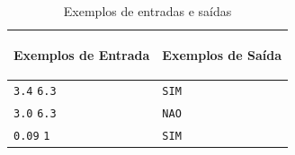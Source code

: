 \begin{table}[ht]
    \centering
    \begin{tabular}{|p{12cm}|p{3cm}|}
        \hline
        \begin{center}
            \vspace{-0.3cm}
            \textbf{Exemplos de Entrada}
            \vspace{-0.3cm}
        \end{center} 
         &  
        \begin{center}
            \vspace{-0.3cm}
            \textbf{Exemplos de Saída}
            \vspace{-0.3cm}
        \end{center} \\ \hline
		    \texttt{3.4} \texttt{6.3}  & \texttt{SIM} \\
         \hline
   		    \texttt{3.0} \texttt{6.3}  & \texttt{NAO} \\
         \hline    
   		    \texttt{0.09} \texttt{1}  & \texttt{SIM} \\
         \hline    
    \end{tabular}
    \caption{Exemplos de entradas e saídas}

\end{table}


\newpage

\begin{center}
\noindent

\end{center}